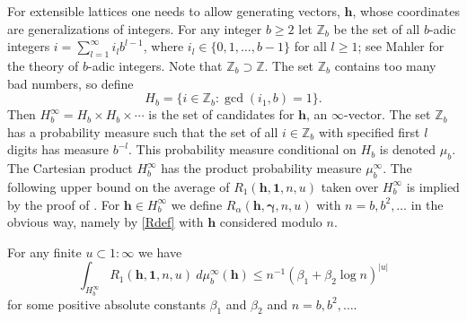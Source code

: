 \documentclass{article}
\renewcommand{\vec}[1]{\ensuremath{\mathbf{#1}}}
\newcommand{\vecsym}[1]{\ensuremath{\boldsymbol{#1}}}
\def\abs#1{\ensuremath{\left \lvert #1 \right \rvert}}
\newcommand{\bfgam}{\vecsym \gamma}
\newcommand{\one}{\vecsym 1}
\newcommand{\h}{\vec h}
\newcommand{\Zb}{\mathbb{Z}_{b}}
\newcommand{\Z}{\mathbb{Z}}
\begin{document}
For extensible lattices one needs to allow generating vectors, $\h$,
whose coordinates are generalizations of integers.  For any integer $b \ge 2$
let $\Zb$ be the set of all $b$-adic integers
$i= \sum_{l=1}^{\infty}i_{l}b^{l-1}$, where $i_{l} \in \{0,1, \ldots, b-1 \}$
for all $l \ge 1$; see Mahler \cite{Mah73} for the theory of $b$-adic integers.
 Note that $\Zb
\supset \Z$.  The set $\Zb$ contains too many bad numbers, so define
$$
H_{b} = \{ i \in \Zb : \gcd(i_{1},b)=1\}.
$$
Then $H_{b}^{\infty} = H_{b} \times H_{b} \times \cdots$ is the set of
candidates for $\h$, an $\infty$-vector.  The set $\Zb$ has a
probability measure such that the set of all $i\in \Zb$ with specified
first $l$ digits has measure $b^{-l}$.  This probability measure
conditional on $H_{b}$ is denoted $\mu_{b}$.  The Cartesian product $H_{b}^{\infty}$
has the product probability measure $\mu_{b}^{\infty}$.  The following upper bound
on the average of $R_1(\h,\one,n,u)$ taken over $H_{b}^{\infty}$ is implied by the proof of \cite[Theorem 1]{Nie78b}. For $\h \in H_b^{\infty}$ we define
$R_{\alpha}(\h,\bfgam,n,u)$ with $n=b,b^2,\ldots$ in the obvious way, namely
by \eqref{Rdef} with $\h$ considered modulo $n$. 

\begin{lemma} \label{Haraldlem} For any finite $u \subset 1:\infty$ we have 
$$
\int_{H_{b}^{\infty}} R_{1}(\h,\one,n,u) \ d\mu_{b}^{\infty}(\h) \le n^{-1} 
(\beta_{1} + \beta_{2} \log n)^{\abs{u}}
$$
for some positive absolute constants $\beta_{1}$ and $\beta_{2}$ and $n=b, 
b^{2}, \ldots$.
\end{lemma}
\end{document}
